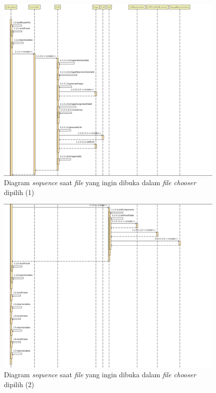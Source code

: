 \begin{figure}
\centering
\captionsetup{justification=centering}
\includegraphics[scale=0.375]{Gambar/Analisis/SequenceDiagramFileChooser1.png}
\caption[Diagram \textit{sequence} saat \textit{file} yang ingin dibuka dalam \textit{file chooser} dipilih (1)]{Diagram \textit{sequence} saat \textit{file} yang ingin dibuka dalam \textit{file chooser} dipilih (1)}
\label{fig:sequencefilechooser1}
\end{figure}

\begin{figure}
\centering
\captionsetup{justification=centering}
\includegraphics[scale=0.375]{Gambar/Analisis/SequenceDiagramFileChooser2.png}
\caption[Diagram \textit{sequence} saat \textit{file} yang ingin dibuka dalam \textit{file chooser} dipilih (2)]{Diagram \textit{sequence} saat \textit{file} yang ingin dibuka dalam \textit{file chooser} dipilih (2)}
\label{fig:sequencefilechooser2}
\end{figure}


